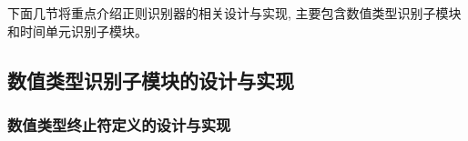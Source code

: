 下面几节将重点介绍正则识别器的相关设计与实现, 主要包含数值类型识别子模块和时间单元识别子模块。

\subsection{数值类型识别子模块的设计与实现}

\subsubsection{数值类型终止符定义的设计与实现}

